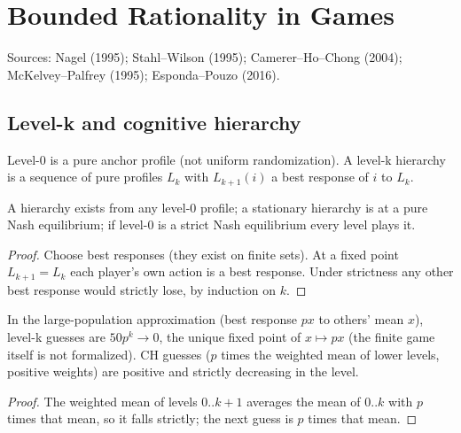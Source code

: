 \chapter{Bounded Rationality in Games}
\label{chap:bounded-rationality}

Sources: Nagel (1995); Stahl--Wilson (1995); Camerer--Ho--Chong (2004); McKelvey--Palfrey (1995);
Esponda--Pouzo (2016).

\section{Level-k and cognitive hierarchy}
\label{sec:br-levelk}

\begin{definition}
\label{def:br-game}
\leanok
Level-0 is a pure anchor profile (not uniform randomization). A level-k hierarchy is a sequence of pure profiles $L_k$ with $L_{k+1}(i)$ a best response of $i$ to $L_k$.
\end{definition}

\begin{theorem}
\label{thm:br-levelk}
\leanok
{}
A hierarchy exists from any level-0 profile; a stationary hierarchy is at a pure Nash equilibrium; if level-0 is
a strict Nash equilibrium every level plays it.
\end{theorem}
\begin{proof}
\leanok
Choose best responses (they exist on finite sets). At a fixed point $L_{k+1}=L_k$ each player's own action is a
best response. Under strictness any other best response would strictly lose, by induction on $k$.
\end{proof}

\begin{theorem}
\label{thm:br-beauty}
\leanok
In the large-population approximation (best response $px$ to others' mean $x$), level-k guesses are $50p^k\to0$,
the unique fixed point of $x\mapsto px$ (the finite game itself is not formalized). CH guesses ($p$ times the weighted mean
of lower levels, positive weights) are positive and strictly decreasing in the level.
\end{theorem}
\begin{proof}
\leanok
The weighted mean of levels $0..k+1$ averages the mean of $0..k$ with $p$ times that mean, so it falls strictly;
the next guess is $p$ times that mean.
\end{proof}

